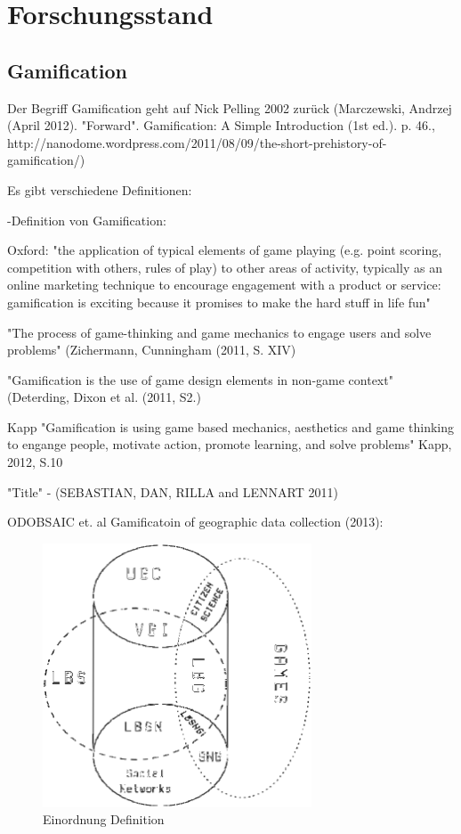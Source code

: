 \section{Forschungsstand}
\label{sec:S3_Forschungsstand}

\subsection{Gamification}

Der Begriff Gamification geht auf Nick Pelling 2002 zurück (Marczewski, Andrzej (April 2012). "Forward". Gamification: A Simple Introduction (1st ed.). p. 46., http://nanodome.wordpress.com/2011/08/09/the-short-prehistory-of-gamification/)

Es gibt verschiedene Definitionen:

-Definition von Gamification:

Oxford:
"the application of typical elements of game playing (e.g. point scoring, competition with others, rules of play) to other areas of activity, typically as an online marketing technique to encourage engagement with a product or service:
gamification is exciting because it promises to make the hard stuff in life fun"

"The process of game-thinking and game mechanics to engage users and solve problems"
(Zichermann, Cunningham (2011, S. XIV)

"Gamification is the use of game design elements in non-game context"
(Deterding, Dixon et al. (2011, S2.)

Kapp "Gamification is using game based mechanics, aesthetics and game thinking to engange people, motivate action, promote learning, and solve problems"
Kapp, 2012, S.10


"Title" - (SEBASTIAN, DAN, RILLA and LENNART 2011)

ODOBSAIC et. al Gamificatoin of geographic data collection (2013):

\begin{figure}[H]
\begin{center}
\includegraphics[width=80mm]{images/ch3_img01_LBG_SN_etc.png}
\caption{Einordnung Definition}
\label{img:ch3_img01_LBG_SN_etc}
\end{center}
\end{figure}

